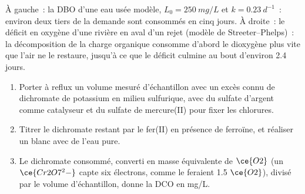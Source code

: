 \begin{omfigure}

{\small À gauche~: la DBO d'une eau usée modèle, $L_0 = \qty{250}{mg/L}$ et $k = \qty{0.23}{d^{-1}}$~: environ deux tiers de la
demande sont consommés en cinq jours. À droite~: le déficit en oxygène d'une
rivière en aval d'un rejet (modèle de Streeter--Phelps)~: la décomposition
de la charge organique consomme d'abord le dioxygène plus vite que l'air ne
le restaure, jusqu'à ce que le déficit culmine au bout d'environ 2.4 jours.}
\end{omfigure}

\begin{method}\label{met:b3:environmental-toxicology:cod}
\begin{enumerate}
  \item Porter à reflux un volume mesuré d'échantillon avec un excès connu
        de dichromate de potassium en milieu sulfurique, avec du sulfate
        d'argent comme catalyseur et du sulfate de mercure(II) pour fixer
        les chlorures.
  \item Titrer le dichromate restant par le fer(II) en présence de
        ferroïne, et réaliser un blanc avec de l'eau pure.
  \item Le dichromate consommé, converti en masse équivalente de $\ce{O2}$ (un
        $\ce{Cr2O7^2-}$ capte six électrons, comme le feraient 1.5 $\ce{O2}$), divisé par le volume d'échantillon, donne la
        DCO en mg/L.
\end{enumerate}
\end{method}


